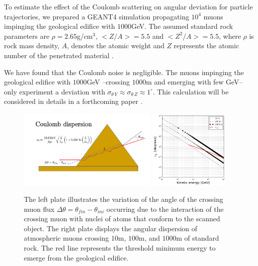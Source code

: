 \documentclass[letterpaper,10pt,titlepage,linenumber]{article}
\begin{document}
To estimate the effect of the Coulomb scattering on angular deviation for particle trajectories, we prepared a GEANT4 simulation propagating $10^{4}$ muons impinging the geological edifice with $1000$GeV. The assumed standard rock parameters are $\rho =2.65$g/cm$^{3}$, $<Z/A> = 5.5$ and  $<Z^{2}/A> = 5.5$, where $\rho$ is rock mass density, $A$, denotes the atomic weight and $Z$ represents the atomic number of the penetrated material \cite{OliveEtal2014,Groom2001}. 

We have found that the Coulomb noise is negligible. The muons impinging the geological edifice with $1000$GeV --crossing $1000$m and emerging with few GeV-- only experiment a deviation with $\sigma_{\theta\, Y}  \approx \sigma_{\theta \, Z}  \approx 1^{\circ}$. This calculation will be considered in details in a forthcoming paper \cite{PenarodriguezEtal2020prep}.

\begin{figure}
    \centering
    \includegraphics[width=0.60\textwidth]{Figures/CoulombDispersion.png}
    \includegraphics[width=0.35\textwidth]{Figures/Scattering.png}
    \caption{The left plate illustrates the variation of the angle of the crossing muon flux $\Delta \theta = \theta_{fin}-\theta_{ini}$ occurring due to the interaction of the crossing muon with nuclei of atoms that conform to the scanned object. The right plate displays the angular dispersion of atmospheric muons crossing $10$m, $100$m, and $1000$m of standard rock. The red line represents the threshold minimum energy to emerge from the geological edifice.}
    \label{fig:CoulombDispersion}
\end{figure}
\end{document}
